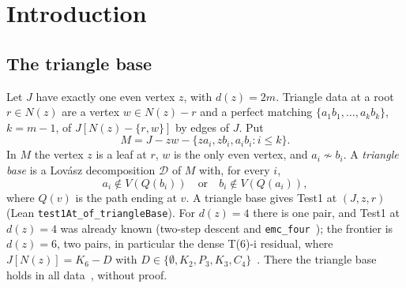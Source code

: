 \documentclass[11pt]{amsart}
\theoremstyle{definition}
\newcommand{\cD}{\mathcal D}
\begin{document}
\begin{abstract}
\begin{itemize}
the residual families of~\cite{T6}, at node budget $2\cdot10^6$ (and $2\cdot10^7$ for the roots left
open), the proportion is $72$ of $180$ roots ($|O|=8$) and $111$ of $144$ ($|O|=10$, with a $C_4$
subfamily at $|O|=8$); on the eight E28 hard graphs it is $10$ of $48$ roots.
\item \emph{The residual} (paper and computation). A schedule needs $2k-1$ \emph{removals}
(retirements, suppressions, and drops that isolate the stem), each at a vertex of degree at most two
(Proposition~\ref{prop:potential}). If $r$ has fewer than $k$
non-neighbours, at most $k-1$ removals are possible, so there is no schedule
(Proposition~\ref{prop:nminus2}, Lean): at $d(z)=6$ this excludes every root of degree $n-2$, which is
$1{,}597$ of the $2{,}589$ unscheduled roots at order~$9$, and roots of every residual shape. In the dense residual, $42$ of
the $53$ other roots that the search proves unscheduled are \emph{frozen}: no reachable state allows a
single removal.
\item \emph{The all-odd lift} (Section~\ref{sec:aodd}). On the all-odd base of~\cite[\S31]{SYN}, where
Test1 needs a Lov\'asz decomposition of an all-odd graph with one fixed and $k-1$ disjunctive
conditions, steering does worse: $2{,}101$ of $8{,}340$ roots at order~$9$ ($25\%$). The obstruction
survives: no root with at most $k-2$ non-neighbours has a schedule (Proposition~\ref{prop:aoddobs}).
\end{itemize}
\end{abstract}
\maketitle

\section{Introduction}\label{sec:intro}

\subsection*{The triangle base} Let $J$ have exactly one even vertex $z$, with $d(z)=2m$. Triangle
data at a root $r\in N(z)$ are a vertex $w\in N(z)-r$ and a perfect matching
$\{a_1b_1,\dots,a_kb_k\}$, $k=m-1$, of $J[N(z)-\{r,w\}]$ by edges of $J$. Put
\[M=J-zw-\{za_i,zb_i,a_ib_i:i\le k\}.\]
In $M$ the vertex $z$ is a leaf at $r$, $w$ is the only even vertex, and $a_i\not\sim b_i$. A
\emph{triangle base} is a Lov\'asz decomposition $\cD$ of $M$ with, for every $i$,
\begin{equation}\label{eq:disj}
a_i\notin V(Q(b_i))\quad\text{or}\quad b_i\notin V(Q(a_i)),
\end{equation}
where $Q(v)$ is the path ending at $v$. A triangle base gives Test1 at $(J,z,r)$~\cite[Thm.~2.1]{DT}
(Lean \texttt{test1At\_of\_triangleBase}). For $d(z)=4$ there is one pair, and Test1 at $d(z)=4$ was
already known (two-step descent and \texttt{emc\_four}~\cite[\S28]{SYN}); the frontier is $d(z)=6$, two pairs, in particular the dense T(6)-i residual, where
$J[N(z)]=K_6-D$ with $D\in\{\emptyset,K_2,P_3,K_3,C_4\}$~\cite{T6}. There the triangle base holds
in all data~\cite[\S6]{DT}, without proof.
\end{document}
